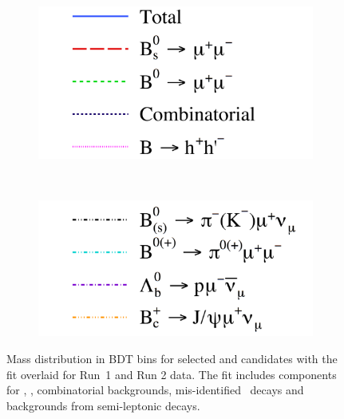 {{\begin{figure}[tbp]
    \begin{subfigure}[b]{0.3\textwidth}
       \includegraphics[width=\textwidth]{./Figs/BFAnalysis/legendA.pdf}
    \end{subfigure}
    ~
    \begin{subfigure}[b]{0.3\textwidth}
       \includegraphics[width=\textwidth]{./Figs/BFAnalysis/legendB.pdf}
    \end{subfigure}
    \caption{Mass distribution in BDT bins for selected \bsmumu and \bdmumu candidates with the fit overlaid for Run\
 1 and Run 2 data. The fit includes components for \bdmumu, \bsmumu, combinatorial backgrounds, mis-identified \bhh \
decays and backgrounds from semi-leptonic decays. }
    \label{fig:BFfit}
\end{figure}



}}
